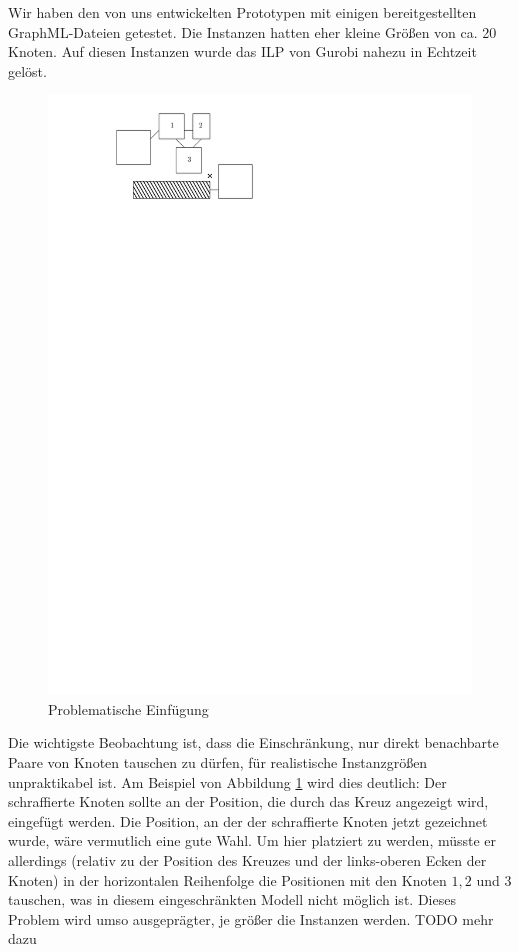 Wir haben den von uns entwickelten Prototypen mit einigen bereitgestellten GraphML-Dateien getestet. Die Instanzen hatten eher kleine Größen von ca. 20 Knoten. Auf diesen Instanzen wurde das ILP von Gurobi nahezu in Echtzeit gelöst.

\begin{figure}
	\begin{center}
		\includegraphics{figures/order.pdf}
		\caption{Problematische Einfügung}
		\label{fig:order-too-strict}
	\end{center}
\end{figure}

Die wichtigste Beobachtung ist, dass die Einschränkung, nur direkt benachbarte Paare von Knoten tauschen zu dürfen, für realistische Instanzgrößen unpraktikabel ist. Am Beispiel von Abbildung \ref{fig:order-too-strict} wird dies deutlich: Der schraffierte Knoten sollte an der Position, die durch das Kreuz angezeigt wird, eingefügt werden. Die Position, an der der schraffierte Knoten jetzt gezeichnet wurde, wäre vermutlich eine gute Wahl. Um hier platziert zu werden, müsste er allerdings (relativ zu der Position des Kreuzes und der links-oberen Ecken der Knoten) in der horizontalen Reihenfolge die Positionen mit den Knoten $1, 2$ und $3$ tauschen, was in diesem eingeschränkten Modell nicht möglich ist. Dieses Problem wird umso ausgeprägter, je größer die Instanzen werden. TODO mehr dazu

